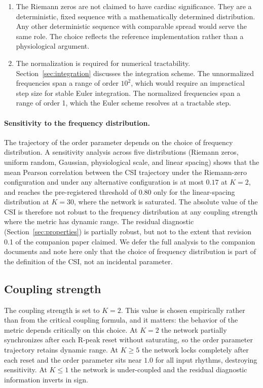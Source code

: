 \documentclass[11pt]{article}
\begin{document}
\begin{enumerate}
\item The Riemann zeros are not claimed to have cardiac significance.
They are a deterministic, fixed sequence with a mathematically
determined distribution. Any other deterministic sequence with
comparable spread would serve the same role. The choice reflects the
reference implementation rather than a physiological argument.

\item The normalization is required for numerical tractability.
Section~\ref{sec:integration} discusses the integration scheme. The
unnormalized frequencies span a range of order $10^2$, which would
require an impractical step size for stable Euler integration. The
normalized frequencies span a range of order 1, which the Euler scheme
resolves at a tractable step.
\end{enumerate}

\paragraph{Sensitivity to the frequency distribution.}
The trajectory of the order parameter depends on the choice of frequency
distribution. A sensitivity analysis across five distributions
(Riemann zeros, uniform random, Gaussian, physiological scale, and
linear spacing) shows that the mean Pearson correlation between the CSI
trajectory under the Riemann-zero configuration and under any
alternative configuration is at most $0.17$ at $K = 2$, and reaches the
pre-registered threshold of $0.80$ only for the linear-spacing
distribution at $K = 30$, where the network is saturated. The absolute
value of the CSI is therefore not robust to the frequency distribution
at any coupling strength where the metric has dynamic range. The
residual diagnostic (Section~\ref{sec:properties}) is partially robust,
but not to the extent that revision 0.1 of the companion paper claimed.
We defer the full analysis to the companion documents and note here only
that the choice of frequency distribution is part of the definition of
the CSI, not an incidental parameter.

\subsection{Coupling strength}

The coupling strength is set to $K = 2$. This value is chosen
empirically rather than from the critical coupling formula, and it
matters: the behavior of the metric depends critically on this choice.
At $K = 2$ the network partially synchronizes after each R-peak reset
without saturating, so the order parameter trajectory retains dynamic
range. At $K \geq 5$ the network locks completely after each reset and
the order parameter sits near $1.0$ for all input rhythms, destroying
sensitivity. At $K \leq 1$ the network is under-coupled and the residual
diagnostic information inverts in sign.
\end{document}
